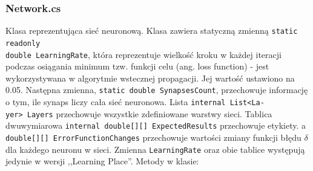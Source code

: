 \documentclass[12pt,a4paper]{article}
\begin{document}
\subsubsection*{Network.cs}
\hspace{20pt} Klasa reprezentująca sieć neuronową. Klasa zawiera statyczną zmienną \lstinline{static readonly} \\ \lstinline{double LearningRate}, która reprezentuje wielkość kroku w każdej iteracji podczas osiągania minimum tzw. funkcji celu (ang. loss function) - jest wykorzystywana w algorytmie wstecznej propagacji. Jej wartość ustawiono na 0.05. Następna zmienna, \lstinline{static double SynapsesCount}, przechowuje informację o tym, ile synaps liczy cała sieć neuronowa. Lista \lstinline{internal List<La-} \\ \lstinline{yer> Layers} przechowuje wszystkie zdefiniowane warstwy sieci. Tablica dwuwymiarowa \lstinline{internal double[][] ExpectedResults} przechowuje etykiety. a \lstinline{double[][] ErrorFunctionChanges} przechowuje wartości zmiany funkcji błędu $\delta$ dla każdego neuronu w sieci. Zmienna \lstinline{LearningRate} oraz obie tablice występują jedynie w wersji ,,Learning Place''. Metody w klasie:
	
\end{document}
